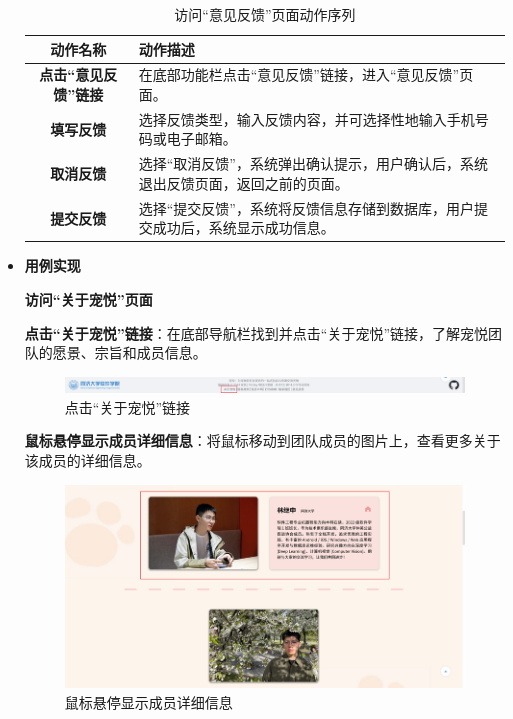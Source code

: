 \begin{itemize}
	\begin{table}[H]
		\centering
		\caption{访问“意见反馈”页面动作序列}
		\renewcommand\arraystretch{1.5}
		\begin{tabular}{|c|>{\raggedright\arraybackslash}p{10cm}|}
			\hline
			\textbf{动作名称} & \textbf{动作描述} \\ \hline
			\textbf{点击“意见反馈”链接} & 在底部功能栏点击“意见反馈”链接，进入“意见反馈”页面。 \\ \hline
			\textbf{填写反馈} & 选择反馈类型，输入反馈内容，并可选择性地输入手机号码或电子邮箱。 \\ \hline
			\textbf{取消反馈} & 选择“取消反馈”，系统弹出确认提示，用户确认后，系统退出反馈页面，返回之前的页面。 \\ \hline
			\textbf{提交反馈} & 选择“提交反馈”，系统将反馈信息存储到数据库，用户提交成功后，系统显示成功信息。 \\ \hline
		\end{tabular}
	\end{table}

	\item \textbf{用例实现}

	\textbf{访问“关于宠悦”页面}

	\textbf{点击“关于宠悦”链接}：在底部导航栏找到并点击“关于宠悦”链接，了解宠悦团队的愿景、宗旨和成员信息。

	\begin{figure}[H]
		\centering
		\includegraphics[scale=0.8]{figures/FooterNavigationBar2.png} 
		\caption{点击“关于宠悦”链接}
	\end{figure}

	\textbf{鼠标悬停显示成员详细信息}：将鼠标移动到团队成员的图片上，查看更多关于该成员的详细信息。

	\begin{figure}[H]
		\centering
		\includegraphics[scale=0.8]{figures/FooterNavigationBar3.png} 
		\caption{鼠标悬停显示成员详细信息}
	\end{figure}


\end{itemize}
